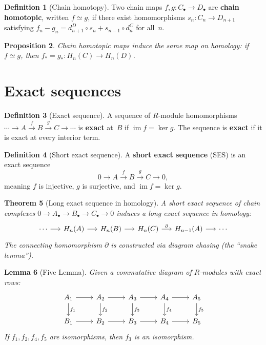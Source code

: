 \documentclass[12pt,a4paper,openany]{book}
\theoremstyle{definition}
\newtheorem{definition}{Definition}[chapter]
\theoremstyle{plain}
\newtheorem{theorem}[definition]{Theorem}
\newtheorem{proposition}[definition]{Proposition}
\newtheorem{lemma}[definition]{Lemma}
\theoremstyle{remark}
\DeclareMathOperator{\im}{im}
\begin{document}
\begin{definition}[Chain homotopy]
Two chain maps $f,g\colon C_\bullet\to D_\bullet$ are \textbf{chain
homotopic}, written $f\simeq g$, if there exist homomorphisms
$s_n\colon C_n\to D_{n+1}$ satisfying
$f_n-g_n = d_{n+1}^D\circ s_n + s_{n-1}\circ d_n^C$ for all~$n$.
\end{definition}

\begin{proposition}
Chain homotopic maps induce the same map on homology: if
$f\simeq g$, then $f_*=g_*\colon H_n(C)\to H_n(D)$.
\end{proposition}

\section{Exact sequences}\label{sec:exact-sequences}

\begin{definition}[Exact sequence]
A sequence of $R$-module homomorphisms
$\cdots\to A\xrightarrow{f}B\xrightarrow{g}C\to\cdots$
is \textbf{exact} at~$B$ if $\im f=\ker g$.  The sequence is
\textbf{exact} if it is exact at every interior term.
\end{definition}

\begin{definition}[Short exact sequence]
A \textbf{short exact sequence} (SES) is an exact sequence
\[
  0\to A\xrightarrow{f}B\xrightarrow{g}C\to 0,
\]
meaning $f$ is injective, $g$ is surjective, and $\im f=\ker g$.
\end{definition}

\begin{theorem}[Long exact sequence in homology]
\label{thm:les-homology}
A short exact sequence of chain complexes
$0\to A_\bullet\to B_\bullet\to C_\bullet\to 0$ induces a long exact
sequence in homology:
\[
\begin{tikzcd}[column sep=1.4em]
  \cdots \ar[r]
  & H_n(A) \ar[r]
  & H_n(B) \ar[r]
  & H_n(C) \ar[r,"\partial"]
  & H_{n-1}(A) \ar[r]
  & \cdots
\end{tikzcd}
\]
The connecting homomorphism $\partial$ is constructed via diagram
chasing (the ``snake lemma'').
\end{theorem}

\begin{lemma}[Five Lemma]\label{lem:five-lemma}
Given a commutative diagram of $R$-modules with exact rows:
\[
\begin{tikzcd}
  A_1\ar[r]\ar[d,"f_1"] & A_2\ar[r]\ar[d,"f_2"]
  & A_3\ar[r]\ar[d,"f_3"] & A_4\ar[r]\ar[d,"f_4"]
  & A_5\ar[d,"f_5"] \\
  B_1\ar[r] & B_2\ar[r] & B_3\ar[r] & B_4\ar[r] & B_5
\end{tikzcd}
\]
If $f_1,f_2,f_4,f_5$ are isomorphisms, then $f_3$ is an isomorphism.
\end{lemma}
\end{document}
